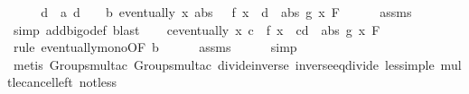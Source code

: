 \begin{isabellebody}
%
\isatagproof
{}\isamarkupfalse%
\ {\isacharminus}{\kern0pt}\isanewline
\ \ \isamarkupfalse%
\ d\ \ a{\isacharcolon}{\kern0pt}\ {\isachardoublequoteopen}d\ {\isachargreater}{\kern0pt}\ {}{\isachardoublequoteclose}\ \ b{\isacharcolon}{\kern0pt}\ {\isachardoublequoteopen}eventually\ {\isacharparenleft}{\kern0pt}{\isasymlambda}x{\isachardot}{\kern0pt}\ abs\ {\isacharparenleft}{\kern0pt}{}\ {\isacharslash}{\kern0pt}\ f\ x{\isacharparenright}{\kern0pt}\ {\isasymle}\ d\ {\isacharasterisk}{\kern0pt}\ abs\ {\isacharparenleft}{\kern0pt}g\ x{\isacharparenright}{\kern0pt}{\isacharparenright}{\kern0pt}\ F{\isacharprime}{\kern0pt}{\isachardoublequoteclose}\isanewline
\ \ \ \ \isamarkupfalse%
\ assms{\isacharparenleft}{\kern0pt}{}{\isacharparenright}{\kern0pt}\ \isamarkupfalse%
\ {\isacharparenleft}{\kern0pt}simp\ add{\isacharcolon}{\kern0pt}bigo{\isacharunderscore}{\kern0pt}def{\isacharcomma}{\kern0pt}\ blast{\isacharparenright}{\kern0pt}\isanewline
\ \ \isamarkupfalse%
\ c{\isacharcolon}{\kern0pt}{\isachardoublequoteopen}eventually\ {\isacharparenleft}{\kern0pt}{\isasymlambda}x{\isachardot}{\kern0pt}\ {\isasymbar}c{\isasymbar}\ {\isacharslash}{\kern0pt}\ {\isasymbar}f\ x{\isasymbar}\ {\isasymle}\ {\isacharparenleft}{\kern0pt}c{\isacharparenright}{\kern0pt}{\isacharasterisk}{\kern0pt}d\ {\isacharasterisk}{\kern0pt}\ abs\ {\isacharparenleft}{\kern0pt}g\ x{\isacharparenright}{\kern0pt}{\isacharparenright}{\kern0pt}\ F{\isacharprime}{\kern0pt}{\isachardoublequoteclose}\isanewline
\ \ \ \ \isamarkupfalse%
\ {\isacharparenleft}{\kern0pt}rule\ eventually{\isacharunderscore}{\kern0pt}mono{\isacharbrackleft}{\kern0pt}OF\ b{\isacharbrackright}{\kern0pt}{\isacharparenright}{\kern0pt}\isanewline
\ \ \ \ \isamarkupfalse%
\ assms{\isacharparenleft}{\kern0pt}{}{\isacharparenright}{\kern0pt}\isanewline
\ \ \ \ \isamarkupfalse%
\ simp\ \isanewline
\ \ \ \ \isamarkupfalse%
\ {\isacharparenleft}{\kern0pt}metis\ Groups{\isachardot}{\kern0pt}mult{\isacharunderscore}{\kern0pt}ac{\isacharparenleft}{\kern0pt}{}{\isacharparenright}{\kern0pt}\ Groups{\isachardot}{\kern0pt}mult{\isacharunderscore}{\kern0pt}ac{\isacharparenleft}{\kern0pt}{}{\isacharparenright}{\kern0pt}\ divide{\isacharunderscore}{\kern0pt}inverse\ inverse{\isacharunderscore}{\kern0pt}eq{\isacharunderscore}{\kern0pt}divide\ less{\isacharunderscore}{\kern0pt}imp{\isacharunderscore}{\kern0pt}le\ mult{\isacharunderscore}{\kern0pt}le{\isacharunderscore}{\kern0pt}cancel{\isacharunderscore}{\kern0pt}left\ not{\isacharunderscore}{\kern0pt}less{\isacharparenright}{\kern0pt}\isanewline

\end{isabellebody}
